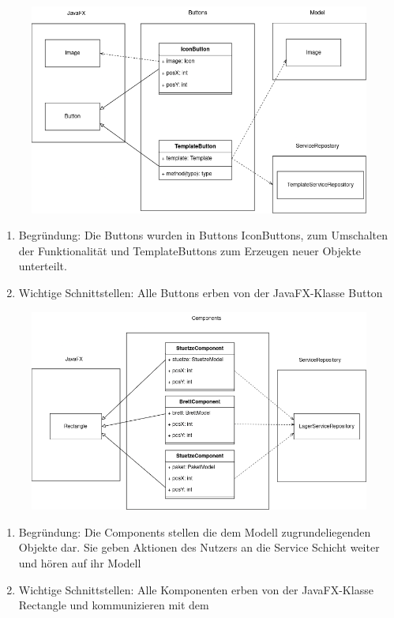 \begin{figure}[H]
    \includegraphics[width=\linewidth]{images/bausteinsicht/Ebene3_Buttons.png}
    \label{fig:Buttons}
\end{figure}
\begin{enumerate}
    \item Begründung: Die Buttons wurden in Buttons IconButtons, zum Umschalten der Funktionalität und TemplateButtons zum Erzeugen neuer Objekte unterteilt.
    \item Wichtige Schnittstellen: Alle Buttons erben von der JavaFX-Klasse Button
\end{enumerate}
\begin{figure}[H]
    \includegraphics[width=\linewidth]{images/bausteinsicht/Ebene3_Components.png}
    \label{fig:Components}
\end{figure}
\begin{enumerate}
    \item Begründung: Die Components stellen die dem Modell zugrundeliegenden Objekte dar. Sie geben Aktionen des Nutzers an die Service Schicht weiter und hören auf ihr Modell
    \item Wichtige Schnittstellen: Alle Komponenten erben von der JavaFX-Klasse Rectangle und kommunizieren mit dem
\end{enumerate}
